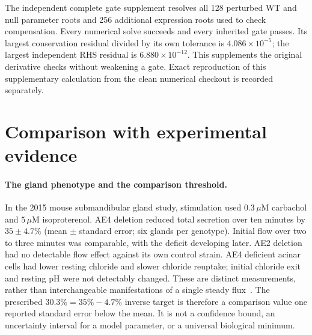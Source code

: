 The independent complete gate supplement resolves all 128 perturbed WT
and null parameter roots and 256 additional expression roots used to
check compensation. Every numerical solve succeeds and every inherited
gate passes. Its largest conservation residual divided by its own tolerance
is $4.086\times10^{-5}$; the largest independent RHS residual is
$6.880\times10^{-12}$. This supplements the original derivative checks
without weakening a gate. Exact reproduction of this supplementary
calculation from the clean numerical checkout is recorded separately.


\section{Comparison with experimental evidence}
\label{m44sec:literature-comparison}

\paragraph{The gland phenotype and the comparison threshold.}
In the 2015 mouse submandibular gland study, stimulation used
$0.3\,\mu\mathrm{M}$ carbachol and $5\,\mu\mathrm{M}$ isoproterenol.
AE4 deletion reduced total secretion over ten minutes by
$35\pm4.7\%$ (mean $\pm$ standard error; six glands per genotype).
Initial flow over two to three minutes was comparable, with the deficit
developing later. AE2 deletion had no detectable flow effect against its
own control strain. AE4 deficient acinar cells had lower resting chloride
and slower chloride reuptake; initial chloride exit and resting pH were
not detectably changed. These are distinct measurements, rather than
interchangeable manifestations of a single steady flux~\cite{m44Pena2015}.
The prescribed $30.3\%=35\%-4.7\%$ inverse target is therefore a
comparison value one reported standard error below the mean. It is not
a confidence bound, an uncertainty interval for a model parameter, or
a universal biological minimum.

